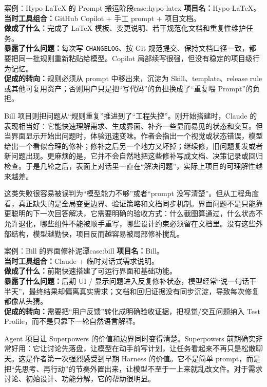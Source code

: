 \documentclass[
  outputdir=build,
  chapterstyle=cn,
  colorscheme=Simple,
  fontset=tech,
  code=false
]{Hypo-Note}
\begin{document}
\begin{example}{案例：Hypo-LaTeX 的 Prompt 搬运阶段}{case:hypo-latex}
\textbf{项目名：}Hypo-LaTeX。\\
\textbf{当时工具组合：}GitHub Copilot + 手工 prompt + 项目文档。\\
\textbf{做成了什么：}完成了 LaTeX 模板、变更说明、若干规范化文档和重复性维护任务。\\
\textbf{暴露了什么问题：}每次写 \texttt{CHANGELOG}、按 Git 规范提交、保持文档口径一致，都要把同一批规则重新粘贴给模型。Copilot 局部续写很强，但没有稳定的项目级行为记忆。\\
\textbf{促成的转向：}规则必须从 prompt 中移出来，沉淀为 Skill、template、release rule 或其他可复用资产；否则用户只是把“写代码”的负担换成了“重复喂 Prompt”的负担。
\end{example}

Bill 项目则把问题从“规则重复”推进到了“工程失控”。刚开始搭建时，Claude 的表现相当好：它能快速理解需求、生成界面、补齐一些显而易见的状态和交互。但当界面显示开始出问题时，体验迅速变味。作者会指出一个视觉或状态错误，模型给出一个看似合理的修补；修补之后另一个地方又坏掉；继续修，旧问题复发或者新问题出现。更麻烦的是，它并不会自然地把这些修补写成文档、决策记录或回归检查。于是几轮之后，表面上对话里一直在“解决问题”，实际上项目的可理解性越来越差。

这类失败很容易被误判为“模型能力不够”或者“prompt 没写清楚”。但从工程角度看，真正缺失的是全局变更边界、验证策略和文档同步机制。界面问题不是只能靠更聪明的下一次回答解决，它需要明确的验收方式：什么截图算通过，什么状态不允许退化，哪些组件不能被顺手重写，哪些设计约束必须留在文档里。没有这些外部结构，模型越勤快，项目反而越容易被局部修补搅乱。

\begin{example}{案例：Bill 的界面修补泥潭}{case:bill}
\textbf{项目名：}Bill。\\
\textbf{当时工具组合：}Claude + 临时对话式需求说明。\\
\textbf{做成了什么：}前期快速搭建了可运行界面和基础功能。\\
\textbf{暴露了什么问题：}后期 UI / 显示问题进入反复修补状态，模型经常“说一句话干半天”，最终结果却偏离真实需求；文档和回归证据没有同步沉淀，导致每次修复都像从头猜。\\
\textbf{促成的转向：}需要把“用户反馈”转化成明确验收证据，把视觉/交互问题纳入 Test Profile，而不是只靠下一轮自然语言解释。
\end{example}

Agent 项目让 Superpowers 的价值和边界同时变得清楚。Superpowers 前期确实非常好用：它让讨论先落盘，让模型在动手前写计划，让任务看起来不再只是松散聊天。这是作者第一次强烈感受到早期 Harness 的价值。它不是简单 prompt，而是把“先思考、再行动”的节奏外置出来，让模型不至于一上来就乱改文件。对于需求讨论、初始设计、功能分解，它的帮助很明显。
\end{document}
